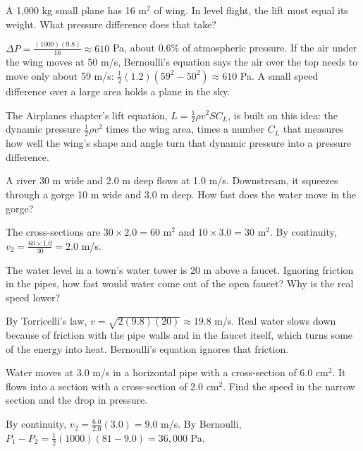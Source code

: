 \begin{Worked}
\begin{Problem}
A 1,000 kg small plane has 16 m$^2$ of wing. In level flight, the lift must equal its weight. What pressure
difference does that take?
\end{Problem}
\begin{Solution}
$\Delta P = \frac{(1000)(9.8)}{16} \approx 610$ Pa, about 0.6\% of atmospheric pressure. If the air under the wing
moves at 50 m/s, Bernoulli's equation says the air over the top needs to move only about 59 m/s:
$\frac{1}{2}(1.2)\left(59^2 - 50^2\right) \approx 610$ Pa. A small speed difference over a large area holds a plane in the sky.
\end{Solution}
\end{Worked}

The Airplanes chapter's lift equation, $L = \frac{1}{2}\rho v^2 S C_L$, is built on this idea: the dynamic pressure $\frac{1}{2}\rho v^2$
times the wing area, times a number $C_L$ that measures how well the wing's shape and angle turn that dynamic pressure into a
pressure difference.

\begin{Exercise}[title={A River Narrows}, label=fl_river]
A river 30 m wide and 2.0 m deep flows at 1.0 m/s. Downstream, it squeezes through a gorge 10 m wide and 3.0 m deep. How fast
does the water move in the gorge?
\end{Exercise}
\begin{Answer}[ref=fl_river]
The cross-sections are $30 \times 2.0 = 60$ m$^2$ and $10 \times 3.0 = 30$ m$^2$. By continuity,
$v_2 = \frac{60 \times 1.0}{30} = 2.0$ m/s.
\end{Answer}

\begin{Exercise}[title={Water Tower}, label=fl_tower]
The water level in a town's water tower is 20 m above a faucet. Ignoring friction in the pipes, how fast would water come out of the
open faucet? Why is the real speed lower?
\end{Exercise}
\begin{Answer}[ref=fl_tower]
By Torricelli's law, $v = \sqrt{2(9.8)(20)} \approx 19.8$ m/s. Real water slows down because of friction with the pipe walls and in
the faucet itself, which turns some of the energy into heat. Bernoulli's equation ignores that friction.
\end{Answer}

\begin{Exercise}[title={A Venturi Meter}, label=fl_venturi]
Water moves at 3.0 m/s in a horizontal pipe with a cross-section of 6.0 cm$^2$. It flows into a section with a cross-section of
2.0 cm$^2$. Find the speed in the narrow section and the drop in pressure.
\end{Exercise}
\begin{Answer}[ref=fl_venturi]
By continuity, $v_2 = \frac{6.0}{2.0}(3.0) = 9.0$ m/s. By Bernoulli,
$P_1 - P_2 = \frac{1}{2}(1000)(81 - 9.0) = 36{,}000$ Pa.
\end{Answer}

